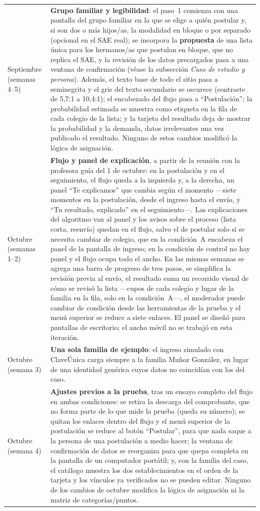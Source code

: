 {\begin{longtable}{p{2.2cm}p{9.5cm}}
Septiembre (semanas 4--5) & \textbf{Grupo familiar y legibilidad}: el paso~1 comienza con una pantalla del grupo familiar en la que se elige a quién postular y, si son dos o más hijos/as, la modalidad en bloque o por separado (opcional en el SAE real); se incorpora la \textbf{propuesta} de una lista única para los hermanos/as que postulan en bloque, que no replica el SAE, y la revisión de los datos precargados pasa a una ventana de confirmación (véase la subsección \emph{Caso de estudio y persona}). Además, el texto base de todo el sitio pasa a seminegrita y el gris del texto secundario se oscurece (contraste de 5,7:1 a 10,4:1); el encabezado del flujo pasa a ``Postulación''; la probabilidad estimada se muestra como etiqueta en la fila de cada colegio de la lista; y la tarjeta del resultado deja de mostrar la probabilidad y la demanda, datos irrelevantes una vez publicado el resultado. Ninguno de estos cambios modificó la lógica de asignación. \\
Octubre (semanas 1--2) & \textbf{Flujo y panel de explicación}, a partir de la reunión con la profesora guía del 1 de octubre: en la postulación y en el seguimiento, el flujo queda a la izquierda y, a la derecha, un panel ``Te explicamos'' que cambia según el momento ---siete momentos en la postulación, desde el ingreso hasta el envío, y ``Tu resultado, explicado'' en el seguimiento---. Las explicaciones del algoritmo van al panel y los avisos sobre el proceso (lista corta, reenvío) quedan en el flujo, salvo el de postular solo si se necesita cambiar de colegio, que en la condición~A encabeza el panel de la pantalla de ingreso; en la condición de control no hay panel y el flujo ocupa todo el ancho. En las mismas semanas se agrega una barra de progreso de tres pasos, se simplifica la revisión previa al envío, el resultado suma un recorrido visual de cómo se revisó la lista ---cupos de cada colegio y lugar de la familia en la fila, solo en la condición~A---, el moderador puede cambiar de condición desde las herramientas de la prueba y el menú superior se reduce a siete enlaces. El panel se diseñó para pantallas de escritorio; el ancho móvil no se trabajó en esta iteración. \\
Octubre (semana 3) & \textbf{Una sola familia de ejemplo}: el ingreso simulado con ClaveÚnica carga siempre a la familia Muñoz González, en lugar de una identidad genérica cuyos datos no coincidían con los del caso. \\
Octubre (semana 4) & \textbf{Ajustes previos a la prueba}, tras un ensayo completo del flujo en ambas condiciones: se retira la descarga del comprobante, que no forma parte de lo que mide la prueba (queda su número); se quitan los enlaces dentro del flujo y el menú superior de la postulación se reduce al botón ``Postular'', para que nada saque a la persona de una postulación a medio hacer; la ventana de confirmación de datos se reorganiza para que quepa completa en la pantalla de un computador portátil; y, con la familia del caso, el catálogo muestra los dos establecimientos en el orden de la tarjeta y los vínculos ya verificados no se pueden editar. Ninguno de los cambios de octubre modifica la lógica de asignación ni la matriz de categorías/puntos. \\

\end{longtable}}

